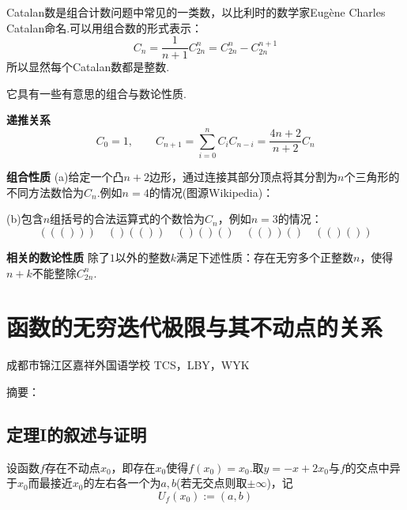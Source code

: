 \documentclass[lang=cn, zihao=5]{elegantbook}
\newcommand{\examplefont}[1]{\color{mgreen} \textbf{#1}}
\begin{document}
Catalan数是组合计数问题中常见的一类数，以比利时的数学家Eugène Charles Catalan命名.可以用组合数的形式表示：$$C_n = \frac{1}{n+1} C_{2n}^{n} = C_{2n}^n - C_{2n}^{n+1}$$
所以显然每个Catalan数都是整数.

它具有一些有意思的组合与数论性质.

\begin{example}{\examplefont{递推关系}}
	$$C_0=1,\qquad C_{n+1} = \sum_{i=0}^{n} C_iC_{n-i} = \frac{4n+2}{n+2} C_n$$
\end{example}

\begin{example}{\examplefont{组合性质}}
	(a)给定一个凸$n+2$边形，通过连接其部分顶点将其分割为$n$个三角形的不同方法数恰为$C_n$.例如$n=4$的情况(图源Wikipedia)：
	\begin{figure}[h!]
	\centering
	
	\end{figure}
	
	\noindent
	(b)包含$n$组括号的合法运算式的个数恰为$C_n$，例如$n=3$的情况：$$((())) \quad ()(()) \quad ()()() \quad (())() \quad (()())$$
\end{example}

\begin{example}{\examplefont{相关的数论性质}}
	除了$1$以外的整数$k$满足下述性质：存在无穷多个正整数$n$，使得$n+k$不能整除$C_{2n}^{n}$.
\end{example}

\newpage

\chapter*{函数的无穷迭代极限与其不动点的关系}

\begin{center}
	成都市锦江区嘉祥外国语学校 \qquad TCS，LBY，WYK
\end{center}

\kaishu
摘要：

\songti
\vspace{2em}

\section*{定理I的叙述与证明}

\begin{definition}
	设函数$f$存在不动点$x_0$，即存在$x_0$使得$f(x_0)=x_0$.取$y=-x+2x_0$与$f$的交点中异于$x_0$而最接近$x_0$的左右各一个为$a,b$(若无交点则取$\pm \infty$)，记$$U_f(x_0):=(a,b)$$
\end{definition}
\end{document}
